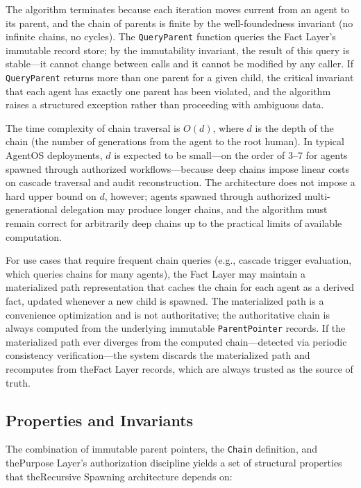 The algorithm terminates because each iteration moves current from an agent to its parent, and the chain of parents is finite by the well-foundedness invariant (no infinite chains, no cycles). The \texttt{QueryParent} function queries the Fact Layer's immutable record store; by the immutability invariant, the result of this query is stable—it cannot change between calls and it cannot be modified by any caller. If \texttt{QueryParent} returns more than one parent for a given child, the critical invariant that each agent has exactly one parent has been violated, and the algorithm raises a structured exception rather than proceeding with ambiguous data.

The time complexity of chain traversal is $O(d)$, where $d$ is the depth of the chain (the number of generations from the agent to the root human). In typical AgentOS deployments, $d$ is expected to be small—on the order of 3–7 for agents spawned through authorized workflows—because deep chains impose linear costs on cascade traversal and audit reconstruction. The architecture does not impose a hard upper bound on $d$, however; agents spawned through authorized multi-generational delegation may produce longer chains, and the algorithm must remain correct for arbitrarily deep chains up to the practical limits of available computation.

For use cases that require frequent chain queries (e.g., cascade trigger evaluation, which queries chains for many agents), the Fact Layer may maintain a materialized path representation that caches the chain for each agent as a derived fact, updated whenever a new child is spawned. The materialized path is a convenience optimization and is not authoritative; the authoritative chain is always computed from the underlying immutable \texttt{ParentPointer} records. If the materialized path ever diverges from the computed chain—detected via periodic consistency verification—the system discards the materialized path and recomputes from theFact Layer records, which are always trusted as the source of truth.

\subsection{Properties and Invariants}

The combination of immutable parent pointers, the \texttt{Chain} definition, and thePurpose Layer's authorization discipline yields a set of structural properties that theRecursive Spawning architecture depends on:

